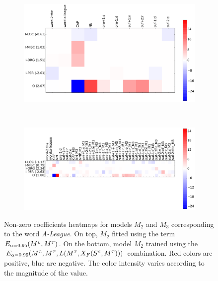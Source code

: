 \begin{figure}
	\centering
	\begin{subfigure}[t]{.9\textwidth}
	\captionsetup{width=\textwidth}
	\centering
	\includegraphics[width=1\linewidth]{images/Chapitre4/M2_1140.pdf}
	\label{fig:trans_M22}
	\end{subfigure}\\%
	\begin{subfigure}[t]{.9\textwidth}
	\captionsetup{width=\textwidth}
	\centering
	\includegraphics[width=1\linewidth]{images/Chapitre4/M3_1140.pdf}
	\label{fig:trans_M3}
	\end{subfigure}
	\caption{Non-zero coefficients heatmaps   for models $M_2$ and $M_3$ corresponding to the word \textit{A-League}. On top, $M_2$ fitted using the term $E_{\alpha=0.95}(M^{\scriptscriptstyle L}, M^{\scriptscriptstyle T})$. On the bottom, model  $M_2$ trained using the  $E_{\alpha=0.95}(M^{\scriptscriptstyle L}, M^{\scriptscriptstyle T}, L(M^{\scriptscriptstyle T}, X_F(S^{\scriptscriptstyle S}, M^{\scriptscriptstyle T})))$ combination. Red colors are positive, blue are negative. The color intensity varies according to the magnitude of the value.}
	\label{fig:trans_M2_M3}
\end{figure}



